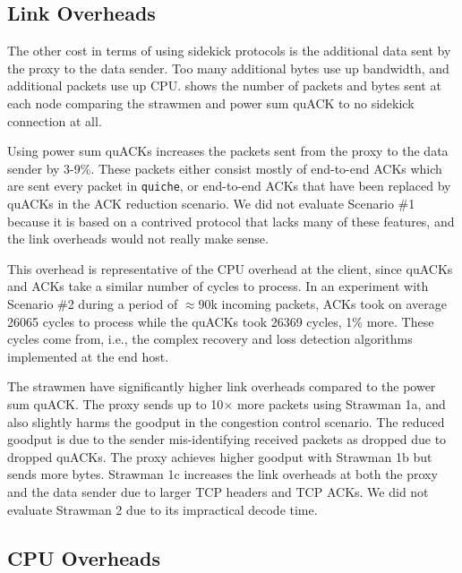 \subsection{Link Overheads}



The other cost in terms of using sidekick protocols is the additional data
sent by the proxy to the data sender.
Too many additional bytes use up bandwidth, and additional packets use
up CPU\@.
 shows the number of packets and bytes sent at each
node comparing the strawmen and power sum quACK to no sidekick connection at all.

Using power sum quACKs increases the packets sent from the proxy to the data
sender
by 3-9\%. These packets either consist mostly
of end-to-end ACKs which are sent every packet in \texttt{quiche}, or end-to-end
ACKs that have been replaced by quACKs in the ACK reduction scenario.
We did not evaluate Scenario \#1 because it is based
on a contrived protocol that lacks many of these features, and the link
overheads would not really make sense.

This overhead is representative of the CPU overhead at the client, since
quACKs and ACKs take a similar number of cycles to process. In an experiment
with Scenario \#2 during a period of $\approx90$k incoming packets, ACKs took on
average 26065 cycles to process while the quACKs took 26369 cycles, 1\% more.
These cycles come from, i.e., the complex recovery and loss detection algorithms
implemented at the end host.

The strawmen have significantly higher link overheads compared to the power sum
quACK\@. The proxy sends up to 10$\times$ more packets using Strawman 1a, and
also slightly harms the goodput in the congestion control scenario.
The reduced goodput is due to the sender mis-identifying received packets as
dropped due to dropped quACKs.
The proxy achieves higher goodput with Strawman 1b but sends
more bytes. Strawman 1c increases the link overheads at both the proxy and the
data sender due to larger TCP headers and TCP ACKs.
We did not evaluate Strawman 2 due to its impractical decode time.

\subsection{CPU Overheads}



